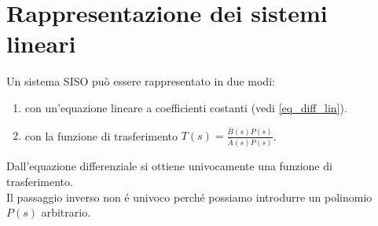 \documentclass[../main.tex]{subfiles}
\begin{document}
	\section{Rappresentazione dei sistemi lineari}
	Un sistema SISO può essere rappresentato in due modi:
	\begin{enumerate}
		\item con un'equazione lineare a coefficienti costanti (vedi \ref{eq_diff_lin}).
		\item con la funzione di trasferimento $ T(s) = \frac{\bar{B}(s)P(s)}{\bar{A}(s)P(s)} $.
	\end{enumerate}
	Dall'equazione differenziale si ottiene univocamente una funzione di trasferimento.\\
	Il passaggio inverso non \'{e} univoco perch\'{e} possiamo introdurre un polinomio $ P(s) $ arbitrario.\\
\end{document}
